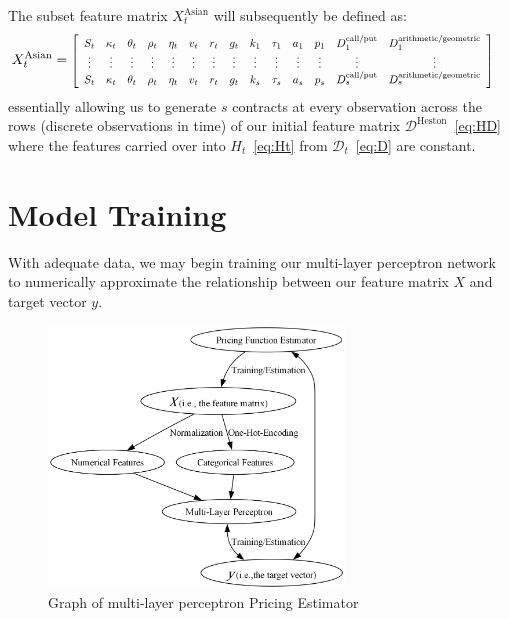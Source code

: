 \documentclass[11pt]{article}
\newcommand{\D}{\mathcal{D}}
\begin{document}
			\vfill
			The subset feature matrix $X^{\text{Asian}}_{t}$ will subsequently be defined as:
			\begin{align}
				X^{\text{Asian}}_{t} &= 
				\scalebox{0.8}{$
					\left[
					\begin{array}{cccccccccccccc}
						S_{t} & \kappa_{t} & \theta_{t} & \rho_{t} & \eta_{t} & v_{t} & r_{t} & g_{t} & k_{1} & \tau_{1} & a_{1} & p_{1} & D^{\text{call/put}}_{1} & D^{\text{arithmetic/geometric}}_{1} \\
						\vdots & \vdots & \vdots & \vdots & \vdots & \vdots & \vdots & \vdots & \vdots & \vdots & \vdots & \vdots & \vdots & \vdots \\
						S_{t} & \kappa_{t} & \theta_{t} & \rho_{t} & \eta_{t} & v_{t} & r_{t} & g_{t} & k_{s} & \tau_{s} & a_{s} & p_{s} & D^{\text{call/put}}_{s} & D^{\text{arithmetic/geometric}}_{s} \\
					\end{array}
					\right]$} \label{eq:AXt}
			\end{align}
			essentially allowing us to generate $s$ contracts at every observation across the rows (discrete observations in time) of our initial feature matrix $\D^{\text{Heston}}$~\eqref{eq:HD} where the features carried over into $H_{t}$~\eqref{eq:Ht} from $\D_{t}$~\eqref{eq:D} are constant.
		
	\vfill
	\newpage

\section{Model Training}
	With adequate data, we may begin training our multi-layer perceptron network to numerically approximate the relationship between our feature matrix $X$ and target vector $y$.
	\par
	\begin{figure}[h]
		\centering
		\includegraphics[width=0.7\textwidth]{MLP.png}
		\caption{Graph of multi-layer perceptron Pricing Estimator}
		\label{fig:MLP}
	\end{figure}
\end{document}
